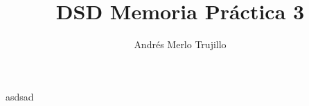 \documentclass{article}
\title{DSD Memoria Práctica 3}
\author{Andrés Merlo Trujillo}
\date{}
\begin{document}
\maketitle
asdsad
\end{document}
